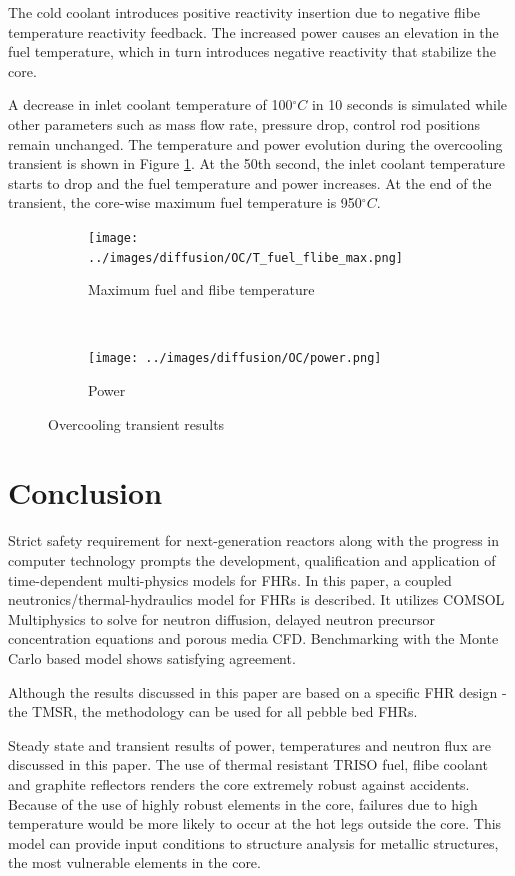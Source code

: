 \documentclass{elsarticle}
\begin{document}
 The cold coolant introduces positive reactivity insertion due to negative flibe temperature reactivity feedback. The increased power causes an elevation in the fuel temperature, which in turn introduces negative reactivity that stabilize the core. 

A decrease in inlet coolant temperature of 100$^{\circ}C$ in 10 seconds is simulated while other parameters such as mass flow rate, pressure drop, control rod positions remain unchanged. The temperature and power evolution during the overcooling transient is shown in Figure \ref{fig:OC}. At the 50th second, the inlet coolant temperature starts to drop and the fuel temperature and power increases. At the end of the transient, the core-wise maximum fuel temperature is 950$^{\circ}C$. 

\begin{figure}[h!]
    \centering
    \begin{subfigure}[b]{0.45\columnwidth}
        \centering
        \texttt{[image: ../images/diffusion/OC/T\_fuel\_flibe\_max.png]}
        \caption{Maximum fuel and flibe temperature}
    \end{subfigure}%
    ~
    \begin{subfigure}[b]{0.45\columnwidth}
        \centering
        \texttt{[image: ../images/diffusion/OC/power.png]}
        \caption{Power}
    \end{subfigure}
    \caption{Overcooling transient results}
    \label{fig:OC}
\end{figure}






\section{Conclusion}
Strict safety requirement for next-generation reactors along with the progress in computer technology prompts the development, qualification and application of time-dependent multi-physics models for FHRs.
In this paper, a coupled neutronics/thermal-hydraulics model for FHRs is described. It utilizes COMSOL Multiphysics to solve for neutron diffusion, delayed neutron precursor concentration equations and porous media CFD. Benchmarking with the Monte Carlo based model shows satisfying agreement. 

Although the results discussed in this paper are based on a specific FHR design - the TMSR, the methodology can be used for all pebble bed FHRs.

Steady state and transient results of power, temperatures and neutron flux are discussed in this paper. The use of thermal resistant TRISO fuel, flibe coolant and graphite reflectors renders the core extremely robust against accidents. 
Because of the use of highly robust elements in the core, failures due to high temperature would be more likely to occur at the hot legs outside the core.
This model can provide input conditions to structure analysis for metallic structures, the most vulnerable elements in the core. 
\end{document}
